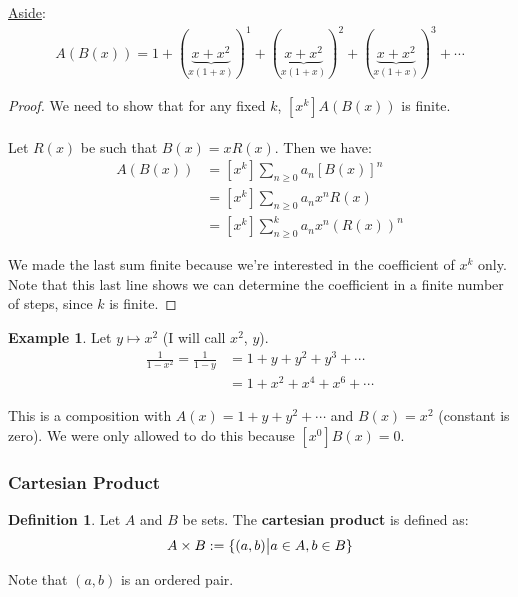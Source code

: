 \documentclass[]{article}
\theoremstyle{definition}
\newtheorem*{defn}{Definition}
\newtheorem{ex}{Example}[section]
\DeclarePairedDelimiter{\set}{\lbrace}{\rbrace}
\begin{document}
				\underline{Aside}:
				\begin{align*}
					A(B(x)) = 1 + (\underbrace{x + x^2}_{x(1+x)})^1 + (\underbrace{x + x^2}_{x(1+x)})^2 + (\underbrace{x + x^2}_{x(1+x)})^3 + \cdots
				\end{align*}

				\begin{proof}
					We need to show that for any fixed $k$, $[x^k]A(B(x))$ is finite.
					\\ \\
					Let $R(x)$ be such that $B(x) = xR(x)$. Then we have:
					\begin{align*}
						[x^k]A(B(x)) &= [x^k] \sum_{n \ge 0} a_n[B(x)]^n \\
						&= [x^k] \sum_{n \ge 0} a_n x^n R(x) \\
						&= [x^k] \sum_{n \ge 0}^{k} a_n x^n (R(x))^n
					\end{align*}

					We made the last sum finite because we're interested in the coefficient of $x^k$ only. Note that this last line shows we can determine the coefficient in a finite number of steps, since $k$ is finite.
				\end{proof}

				\begin{ex}
					Let $y \mapsto x^2$ (I will call $x^2$, $y$).
					\begin{align*}
						\frac{1}{1 - x^2} = \frac{1}{1 - y} &= 1 + y + y^2 + y^3 + \cdots \\
					&= 1 + x^2 + x^4 + x^6 + \cdots
					\end{align*}

					This is a composition with $A(x) = 1 + y + y^2 + \cdots$ and $B(x) = x^2$ (constant is zero). We were only allowed to do this because $[x^0]B(x) = 0$.
				\end{ex}
			\subsubsection{Cartesian Product}
				\begin{defn}
					Let $A$ and $B$ be sets. The \textbf{cartesian product} is defined as:
					\begin{align*}
						A \times B := \set{(a, b) \big| a \in A, b \in B }
					\end{align*}

					Note that $(a, b)$ is an ordered pair.
				\end{defn}
\end{document}
